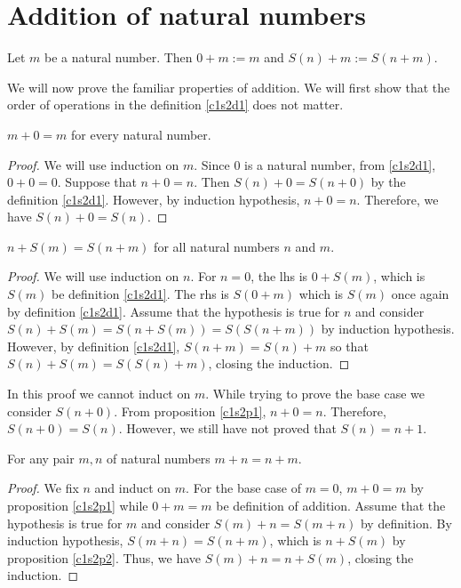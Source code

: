 \section{Addition of natural numbers}\label{c1s2}
\begin{defn}\label{c1s2d1}
Let $m$ be a natural number. Then $0 + m := m$ and $S(n) + m := S(n + m)$.
\end{defn}

We will now prove the familiar properties of addition. We will first show 
that the order of operations in the definition \ref{c1s2d1} does not matter.
\begin{prop}\label{c1s2p1}
$m + 0 = m$ for every natural number.
\end{prop}
\begin{proof}
We will use induction on $m$. Since $0$ is a natural number, from 
\ref{c1s2d1}, $0 + 0 = 0$. Suppose that $n + 0 = n$. Then $S(n) + 0 = 
S(n + 0)$ by the definition \ref{c1s2d1}. However, by induction hypothesis, 
$n + 0 = n$. Therefore, we have $S(n) + 0 = S(n)$.
\end{proof}

\begin{prop}\label{c1s2p2}
$n + S(m) = S(n + m)$ for all natural numbers $n$ and $m$.
\end{prop}
\begin{proof}
We will use induction on $n$. For $n = 0$, the lhs is $0 + S(m)$, which
is $S(m)$ be definition \ref{c1s2d1}. The rhs is $S(0 + m)$ which is $S(m)$
once again by definition \ref{c1s2d1}. Assume that the hypothesis is true
for $n$ and consider $S(n) + S(m) = S(n + S(m)) = S(S(n+m))$ by induction
hypothesis. However, by definition \ref{c1s2d1}, $S(n + m) = S(n) + m$ so
that $S(n) + S(m) = S(S(n) + m)$, closing the induction.
\end{proof}

\begin{rem}
In this proof we cannot induct on $m$. While trying to prove the base case
we consider $S(n + 0)$. From proposition \ref{c1s2p1}, $n + 0 = n$. 
Therefore, $S(n + 0) = S(n)$. However, we still have not proved that $S(n)
= n + 1$.
\end{rem}

\begin{prop}\label{c1s2p3}
For any pair $m, n$ of natural numbers $m + n = n + m$.
\end{prop}
\begin{proof}
We fix $n$ and induct on $m$. For the base case of $m = 0$, $m + 0 = m$ by
proposition \ref{c1s2p1} while $0 + m = m$ be definition of addition. 
Assume that the hypothesis is true for $m$ and consider $S(m) + n = S(m+n)$
by definition. By induction hypothesis, $S(m + n) = S(n + m)$, which is $
n + S(m)$ by proposition \ref{c1s2p2}. Thus, we have $S(m) + n = n + S(m)$,
closing the induction.
\end{proof}

